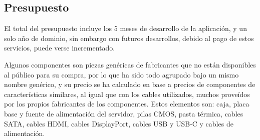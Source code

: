 \documentclass{article}
\begin{document}
\subsection{Presupuesto}

El total del presupuesto incluye los 5 meses de desarrollo de la aplicación, y un solo año de dominio, sin embargo con futuros desarrollos, debido al pago de estos servicios, puede verse incrementado.

Algunos componentes son piezas genéricas de fabricantes que no están disponibles al público para su compra, por lo que ha sido todo agrupado bajo un mismo nombre genérico, y su precio se ha calculado en base a precios de componentes de características similares, al igual que con los cables utilizados, muchos proveídos por los propios fabricantes de los componentes. Estos elementos son: caja, placa base y fuente de alimentación del servidor, pilas CMOS, pasta térmica, cables SATA, cables HDMI, cables DisplayPort, cables USB y USB-C y cables de alimentación.\\
    
\end{document}
